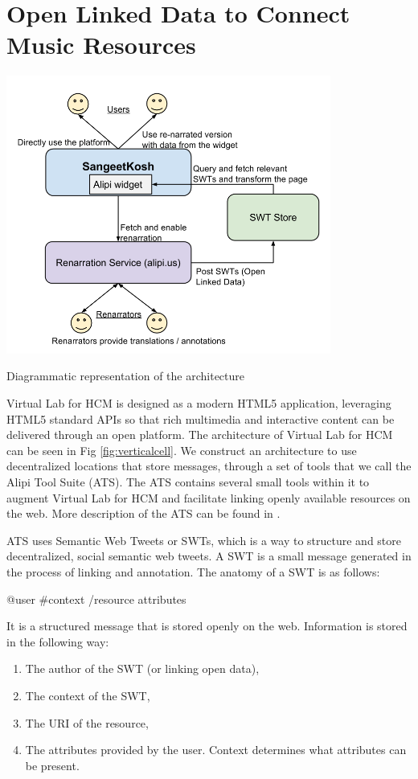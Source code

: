\documentclass{tufte-handout}
\begin{document}
\section{Open Linked Data to Connect Music Resources}
\begin{marginfigure}
\centering
    \includegraphics[width=0.8\textwidth]{alipi.png}
\caption{Diagrammatic representation of the architecture}
\label{fig:verticalcell}
\end{marginfigure}


Virtual Lab for HCM is designed as a modern HTML5 application, leveraging
 HTML5 standard APIs so that rich multimedia and interactive content
can be delivered through an open platform. The architecture of Virtual Lab for HCM can be seen in Fig \ref{fig:verticalcell}. We construct an architecture to use decentralized locations that store messages, through a set of tools that we call the Alipi Tool Suite (ATS). The ATS contains several small tools within it to augment Virtual Lab for HCM and facilitate linking openly available resources on the web. More description of the ATS can be found in \cite{prasad2014overcoming} \cite{dinesh2012alipi}.

ATS uses Semantic Web Tweets or SWTs, which is a way to structure and store decentralized, social semantic web tweets. A SWT  is a small message generated in the process of linking and annotation. The anatomy of a SWT is as follows:

@user \#context /resource {attributes}

It is a structured message that is stored openly on the web. Information is stored in the following way:
\begin{enumerate}
\item The author of the SWT (or linking open data),
\item The context of the SWT,
\item The URI of the resource,
\item The attributes provided by the user. Context determines what attributes can be present.
\end{enumerate}
\end{document}
